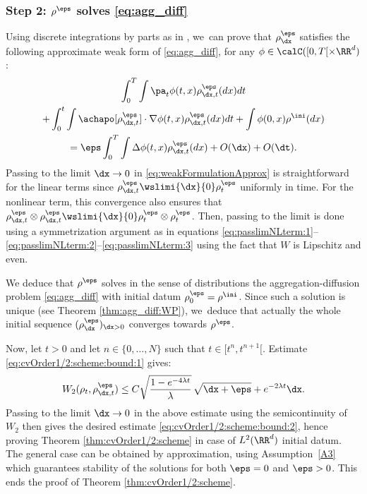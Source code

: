 \subsubsection*{Step 2: $\rho^\eps$ solves \eqref{eq:agg_diff}}

Using discrete integrations by parts as in \cite{cjlv15, lv17}, we~can prove that $\rho_{\dx}^\eps$ satisfies the following approximate weak form of \eqref{eq:agg_diff}, for any $\phi \in \calC([0,T[ \times \RR^d)$:
\begin{multline}\label{eq:weakFormulationApprox}
\int_0^T \int \pa_t \phi(t,x) \rho_{\dx,t}^\eps(dx) dt\\
+ \int_0^t \int \achapo[\rho_{\dx,t}^\eps] \cdot \nabla \phi(t,x) \rho_{\dx,t}^\eps(dx) dt + \int \phi(0,x) \rho^{\ini}(dx) \\
= \eps \int_0^T \int \Delta \phi(t,x) \rho_{\dx,t}^\eps(dx) + O(\dx) + O(\dt).
\end{multline}
Passing to the limit $\dx \to 0$ in \eqref{eq:weakFormulationApprox} is straightforward for the linear terms since $\rho_{\dx,t}^\eps \wslimi{\dx}{0} \rho_t^\eps$ uniformly in time. For the nonlinear term, this convergence also ensures that $\rho_{\dx,t}^\eps \otimes \rho_{\dx,t}^\eps \wslimi{\dx}{0} \rho_t^\eps \otimes \rho_t^\eps$. Then, passing to the limit is done using a symmetrization argument as in equations \eqref{eq:passlimNLterm:1}--\eqref{eq:passlimNLterm:2}--\eqref{eq:passlimNLterm:3} using the fact that $W$ is Lipschitz and even.

We deduce that $\rho^\eps$ solves in the sense of distributions the aggregation-diffusion problem \eqref{eq:agg_diff} with initial datum $\rho_0^\eps = \rho^{\ini}$. Since such a solution is unique (see Theorem \ref{thm:agg_diff:WP}), we~deduce that actually the whole initial sequence $(\rho_{\dx}^\eps)_{\dx > 0}$ converges towards $\rho^\eps$.


Now, let $t>0$ and let $n \in \{0,\ldots,N\}$ such that $t \in [t^n, t^{n+1}[$. Estimate \eqref{eq:cvOrder1/2:scheme:bound:1} gives:
\[
W_2(\rho_{t},\rho_{\dx,t}^{\eps}) \leq C \sqrt{\frac{1 - e^{-4\lambda t}}{\lambda}}\, \sqrt{\dx + \eps} + e^{-2\lambda t} \dx.
\]
Passing to the limit $\dx \to 0$ in the above estimate using the semicontinuity of $W_2$ then gives the desired estimate \eqref{eq:cvOrder1/2:scheme:bound:2}, hence proving Theorem \ref{thm:cvOrder1/2:scheme} in case of $L^2(\RR^d)$ initial datum. The general case can be obtained by approximation, using Assumption~\eqref{A3} which guarantees stability of the solutions for both $\eps = 0$ and $\eps > 0$. This ends the proof of Theorem \ref{thm:cvOrder1/2:scheme}.

